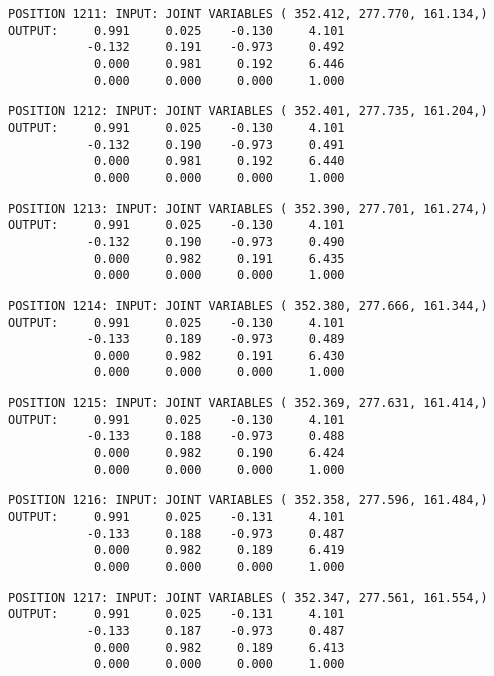 \begin{verbatim}
POSITION 1211: INPUT: JOINT VARIABLES ( 352.412, 277.770, 161.134,)
OUTPUT:     0.991     0.025    -0.130     4.101
           -0.132     0.191    -0.973     0.492
            0.000     0.981     0.192     6.446
            0.000     0.000     0.000     1.000
\end{verbatim} \pagebreak[1]\begin{verbatim}
POSITION 1212: INPUT: JOINT VARIABLES ( 352.401, 277.735, 161.204,)
OUTPUT:     0.991     0.025    -0.130     4.101
           -0.132     0.190    -0.973     0.491
            0.000     0.981     0.192     6.440
            0.000     0.000     0.000     1.000
\end{verbatim} \pagebreak[1]\begin{verbatim}
POSITION 1213: INPUT: JOINT VARIABLES ( 352.390, 277.701, 161.274,)
OUTPUT:     0.991     0.025    -0.130     4.101
           -0.132     0.190    -0.973     0.490
            0.000     0.982     0.191     6.435
            0.000     0.000     0.000     1.000
\end{verbatim} \pagebreak[1]\begin{verbatim}
POSITION 1214: INPUT: JOINT VARIABLES ( 352.380, 277.666, 161.344,)
OUTPUT:     0.991     0.025    -0.130     4.101
           -0.133     0.189    -0.973     0.489
            0.000     0.982     0.191     6.430
            0.000     0.000     0.000     1.000
\end{verbatim} \pagebreak[1]\begin{verbatim}
POSITION 1215: INPUT: JOINT VARIABLES ( 352.369, 277.631, 161.414,)
OUTPUT:     0.991     0.025    -0.130     4.101
           -0.133     0.188    -0.973     0.488
            0.000     0.982     0.190     6.424
            0.000     0.000     0.000     1.000
\end{verbatim} \pagebreak[1]\begin{verbatim}
POSITION 1216: INPUT: JOINT VARIABLES ( 352.358, 277.596, 161.484,)
OUTPUT:     0.991     0.025    -0.131     4.101
           -0.133     0.188    -0.973     0.487
            0.000     0.982     0.189     6.419
            0.000     0.000     0.000     1.000
\end{verbatim} \pagebreak[1]\begin{verbatim}
POSITION 1217: INPUT: JOINT VARIABLES ( 352.347, 277.561, 161.554,)
OUTPUT:     0.991     0.025    -0.131     4.101
           -0.133     0.187    -0.973     0.487
            0.000     0.982     0.189     6.413
            0.000     0.000     0.000     1.000
\end{verbatim} \pagebreak[1]\begin{verbatim}

\end{verbatim}
